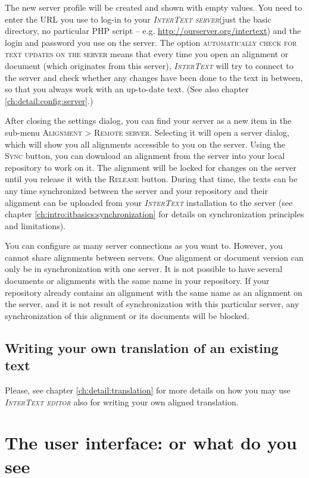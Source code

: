 \documentclass[a4paper,10pt,oneside]{book}
\newcommand{\IT}{\textit{\textsc{InterText}}\xspace}
\newcommand{\ITeditor}{\textit{\textsc{InterText editor}}\xspace}
\newcommand{\ITserver}{\textit{\textsc{InterText server}}\xspace}
\newcommand{\menu}[1]{\textsc{#1}}
\begin{document}
The new server profile will be created and shown with empty values. You need to enter the URL you use to log-in to your \ITserver (just the basic directory, no particular PHP script -- e.g. \url{http://ourserver.org/intertext}) and the login and password you use on the server. The option \menu{automatically check for text updates on the server} means that every time you open an alignment or document (which originates from this server), \IT will try to connect to the server and check whether any changes have been done to the text in between, so that you always work with an up-to-date text. (See also chapter \ref{ch:detail:config:server}.)

After closing the settings dialog, you can find your server as a new item in the sub-menu \menu{Alignment} > \menu{Remote server}. Selecting it will open a server dialog, which will show you all alignments accessible to you on the server. Using the \menu{Sync} button, you can download an alignment from the server into your local repository to work on it. The alignment will be locked for changes on the server until you release it with the \menu{Release} button. During that time, the texts can be any time synchronized between the server and your repository and their alignment can be uploaded from your \IT installation to the server (see chapter \ref{ch:intro:itbasics:synchronization} for details on synchronization principles and limitations).

You can configure as many server connections as you want to. However, you cannot share alignments between servers. One alignment or document version can only be in synchronization with one server. It is not possible to have several documents or alignments with the same name in your repository. If your repository already contains an alignment with the same name as an alignment on the server, and it is not result of synchronization with this particular server, any synchronization of this alignment or its documents will be blocked.

\section{Writing your own translation of an existing text}\label{ch:howto:translation}

Please, see chapter \ref{ch:detail:translation} for more details on how you may use \ITeditor also for writing your own aligned translation.

\chapter{The user interface: or what do you see}\label{ch:howto:interface}
\end{document}
